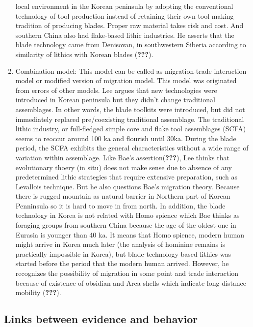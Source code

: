 \documentclass[american,man]{apa6}
\begin{document}
\begin{enumerate}
  local environment in the Korean peninsula by adopting the conventional
  technology of tool production instead of retaining their own tool
  making tradition of producing blades. Proper raw material takes risk
  and cost. And southern China also had flake-based lithic industries.
  He asserts that the blade technology came from Denisovan, in
  southwestern Siberia according to similarity of lithics with Korean
  blades ({\textbf{???}}).
\item
  Combination model: This model can be called as migration-trade
  interaction model or modified version of migration model. This model
  was originated from errors of other models. Lee argues that new
  technologies were introduced in Korean peninsula but they didn't
  change traditional assemblages. In other words, the blade toolkits
  were introduced, but did not immediately replaced pre/coexisting
  traditional assemblage. The traditional lithic industry, or
  full-fledged simple core and flake tool assemblages (SCFA) seems to
  reoccur around 100 ka and flourish until 30ka. During the blade
  period, the SCFA exhibits the general characteristics without a wide
  range of variation within assemblage. Like Bae's
  assertion({\textbf{???}}), Lee thinks that evolutionary thoery (in
  situ) does not make sense due to absence of any predetermined lithic
  strategies that require extensive preparation, such as Levallois
  technique. But he also questions Bae's migration theory. Because there
  is rugged mountain as natural barrier in Northern part of Korean
  Penninsula so it is hard to move in from north. In addition, the blade
  technology in Korea is not related with Homo spience which Bae thinks
  as foraging groups from southern China because the age of the oldest
  one in Eurasia is younger than 40 ka. It means that Homo spience,
  modern human might arrive in Korea much later (the analysis of
  hominine remains is practically impossible in Korea), but
  blade-technology based lithics was started before the period that the
  modern human arrived. However, he recognizes the possibility of
  migration in some point and trade interaction because of existence of
  obsidian and Arca shells which indicate long distance mobility
  ({\textbf{???}}).
\end{enumerate}

\subsection{Links between evidence and
behavior}\label{links-between-evidence-and-behavior}
\end{document}
